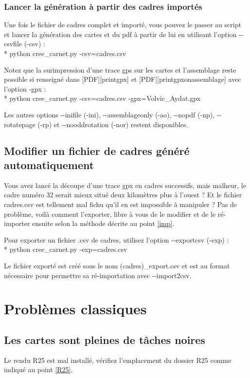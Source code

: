 \documentclass[12pt,french]{article}
\begin{document}
\subsubsection{Lancer la génération à partir des cadres importés}
Une fois le fichier de cadres complet et importé, vous pouvez le passer au script et lancer la génération des cartes et du pdf à partir de lui en utilisant l'option -\mbox{}-csvfile (-csv) : \\*
python cree\_carnet.py -csv=cadres.csv \par 
Notez que la surimpression d'une trace gps sur les cartes et l'assemblage reste possible si renseigné dans [PDF][printgpx] et [PDF][printgpxonassemblage] avec l'option -gpx :\\*
python cree\_carnet.py -csv=cadres.csv -gpx=Volvic\_Aydat.gpx \par 
Les autres options -\mbox{}-inifile (-ini), -\mbox{}-assemblageonly (-ao), -\mbox{}-nopdf (-np), -\mbox{}-rotatepage (-rp) et -\mbox{}-nooddrotation (-nor) restent disponibles.

\subsection{Modifier un fichier de cadres généré automatiquement}
Vous avez lancé la découpe d'une trace gpx en cadres successifs, mais malheur, le cadre numéro 32 serait mieux situé deux kilomètres plus à l'ouest ? Et le fichier cadres.csv est tellement mal fichu qu'il en est impossible à manipuler ? Pas de problème, voilà comment l'exporter, libre à vous de le modifier et de le ré-importer ensuite selon la méthode décrite au point \ref{imp}.\par 
Pour exporter un fichier .csv de cadres, utilisez l'option -\mbox{}-exportcsv (-exp) : \\*
python cree\_carnet.py -exp=cadres.csv \par 
Le fichier exporté est créé sous le nom (cadres)\_export.csv et est au format nécessaire pour permettre sa ré-importation avec -\mbox{}-import2csv.

\section{Problèmes classiques}
\subsection{Les cartes sont pleines de tâches noires}
Le rendu R25 est mal installé, vérifiez l'emplacement du dossier R25 comme indiqué au point \ref{R25}.
\end{document}
